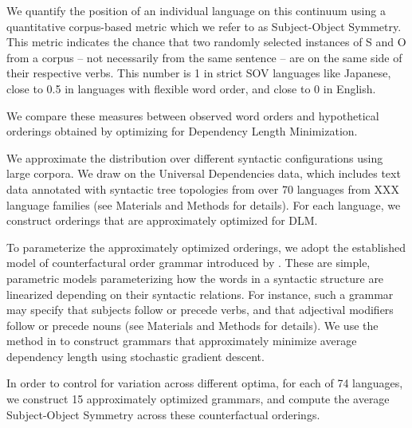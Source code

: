 \documentclass[11pt,a4paper]{article}
\newcommand\comment[1]{{\color{red}#1}}
\newcommand\mhahn[1]{{\color{red}(#1)}}
\begin{document}
We quantify the position of an individual language on this continuum using a quantitative corpus-based metric which we refer to as Subject-Object Symmetry.
This metric indicates the chance that two randomly selected instances of S and O from a corpus -- not necessarily from the same sentence -- are on the same side of their respective verbs. This number is 1 in strict SOV languages like Japanese, close to 0.5 in languages with flexible word order, and close to 0 in English.



We compare these measures between observed word orders and hypothetical orderings obtained by optimizing for Dependency Length Minimization.

We approximate the distribution over different syntactic configurations using large corpora.
We draw on the Universal Dependencies data, which includes text data annotated with syntactic tree topologies from over 70 languages from XXX language families (see Materials and Methods for details).
For each language, we construct orderings that are approximately optimized for DLM.

To parameterize the approximately optimized orderings, we adopt the established model of counterfactural order grammar introduced by \citet{gildea-optimizing-2007}.
These are simple, parametric models parameterizing how the words in a syntactic structure are linearized depending on their syntactic relations.
For instance, such a grammar may specify that subjects follow or precede verbs, and that adjectival modifiers follow or precede nouns (see Materials and Methods for details).
We use the method in \citet{hahn2020universals} to construct grammars that approximately minimize average dependency length using stochastic gradient descent.

In order to control for variation across different optima, for each of 74 languages, we construct 15 approximately optimized grammars, and compute the average Subject-Object Symmetry across these counterfactual orderings.

\end{document}
